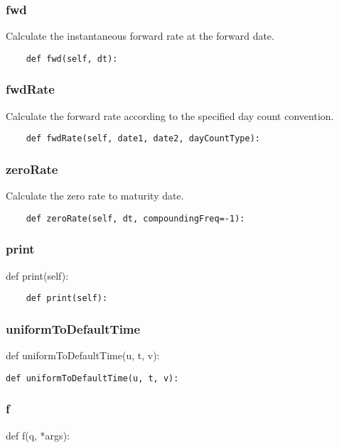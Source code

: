 \documentclass[twoside,11pt]{book}
\begin{document}
\subsubsection*{{\bf fwd}}
Calculate the instantaneous forward rate at the forward date.  

\begin{lstlisting}
    def fwd(self, dt):
\end{lstlisting}

\subsubsection*{{\bf fwdRate}}
Calculate the forward rate according to the specified day count convention.  

\begin{lstlisting}
    def fwdRate(self, date1, date2, dayCountType):
\end{lstlisting}

\subsubsection*{{\bf zeroRate}}
Calculate the zero rate to maturity date.  

\begin{lstlisting}
    def zeroRate(self, dt, compoundingFreq=-1):
\end{lstlisting}

\subsubsection*{{\bf print}}
def print(self): 

\begin{lstlisting}
    def print(self):
\end{lstlisting}

\subsubsection*{{\bf uniformToDefaultTime}}
def uniformToDefaultTime(u, t, v): 

\begin{lstlisting}
def uniformToDefaultTime(u, t, v):
\end{lstlisting}

\subsubsection*{{\bf f}}
def f(q, *args): 
\end{document}
